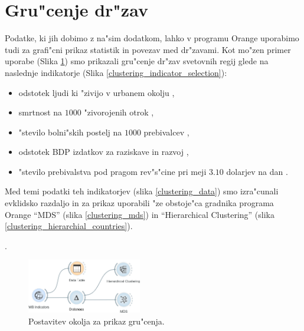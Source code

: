 \section{Gru"cenje dr"zav}


Podatke, ki jih dobimo z na"sim dodatkom, lahko v programu Orange uporabimo tudi
za grafi"cni prikaz statistik in povezav med dr"zavami. Kot mo"zen primer
uporabe (Slika \ref{clustering_setup}) smo prikazali gru"cenje dr"zav svetovnih regij glede na naslednje
indikatorje (Slika \ref{clustering_indicator_selection}):
\begin{itemize}
  \item odstotek ljudi ki "zivijo v urbanem okolju 
    ,
  \item smrtnost na $1000$ "zivorojenih otrok
    ,
  \item "stevilo bolni"skih postelj na $1000$ prebivalcev
    ,
  \item odstotek BDP izdatkov za raziskave in razvoj
    ,
  \item "stevilo prebivalstva pod pragom rev"s"cine pri meji $3.10$ dolarjev na dan
    .
\end{itemize}
Med temi podatki teh indikatorjev (slika \ref{clustering_data}) smo izra"cunali evklidsko razdaljo in za prikaz 
uporabili "ze obstoje"ca gradnika programa Orange
``MDS'' (slika \ref{clustering_mds}) in
``Hierarchical Clustering'' (slika \ref{clustering_hierarchial_countries}).



. 


\begin{figure}
\begin{center}
\includegraphics[width=5cm]{pic/clustering_setup.png}
\end{center}
\caption{Postavitev okolja za prikaz gru"cenja.}
\label{clustering_setup}
\end{figure} 

